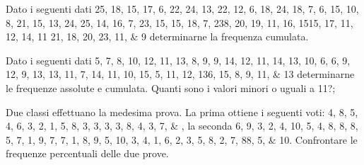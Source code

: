 \begin{esercizio}
Dato i seguenti dati \numlist{25; 18; 15; 17; 6; 22; 24; 13; 22; 12; 6; 18; 24; 18; 7; 6; 15; 10; 8; 21; 15; 13;
	24; 25; 14; 16; 7; 23; 15; 15; 18; 7; 23 8; 20; 19; 11; 16; 15 15; 17; 11; 12; 14; 11
	21; 18; 20; 23; 11; 9} determinarne la frequenza cumulata.
\end{esercizio}
\begin{esercizio}
		Dato i seguenti dati \numlist{5; 7; 8; 10; 12; 11; 13; 8; 9; 9; 14; 12; 11; 14; 13; 10; 6; 6; 9; 12; 9; 13; 13; 11;
			7; 14; 11; 10; 15; 5; 11; 12; 13 6; 15; 8; 9; 11; 13} determinarne le frequenze assolute e cumulata. Quanti sono i valori minori o uguali a \num{11}?;
	\end{esercizio}
	\begin{esercizio}
	Due classi effettuano la medesima prova. La prima ottiene i seguenti voti: \numlist{4; 8; 5; 4; 6; 3; 2; 1; 5; 8; 3; 3; 3; 3; 8; 4; 3; 7;}, la seconda \numlist{6; 9; 3; 2; 4; 10; 5; 4; 8; 8; 8; 5; 7; 1; 9; 7; 7; 1; 8; 9; 5; 10; 3; 4; 1; 6; 2; 3; 5;
		8; 2; 7; 8 8; 5; 10}. Confrontare le frequenze percentuali delle due prove.
\end{esercizio} 
